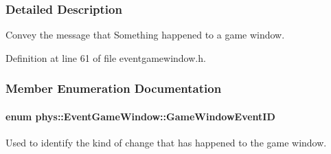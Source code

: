 \subsubsection{Detailed Description}
Convey the message that Something happened to a game window. 

Definition at line 61 of file eventgamewindow.h.



\subsubsection{Member Enumeration Documentation}
\hypertarget{classphys_1_1EventGameWindow_a45225255070513d3cff88cdfea25cc09}{
\paragraph[{GameWindowEventID}]{\setlength{\rightskip}{0pt plus 5cm}enum {\bf phys::EventGameWindow::GameWindowEventID}}\hfill}
\label{classphys_1_1EventGameWindow_a45225255070513d3cff88cdfea25cc09}


Used to identify the kind of change that has happened to the game window. 

